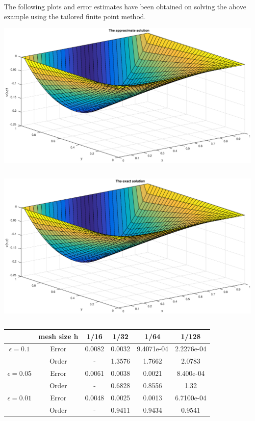 The following plots and error estimates have been obtained on solving the above example using the 
tailored finite point method.
\includegraphics[height=8cm]{Figures/CDR_approx_2.eps}\\
\includegraphics[height=8cm]{Figures/CDR_exact_1.eps}\\

\begin{tabular}{|c|c|c|c|c|c|}
   \hline
  & mesh size h  & 1/16  & 1/32 & 1/64 &  1/128\\
  \hline
 $\epsilon = 0.1$ & Error  & 0.0082  & 0.0032 & 9.4071e-04 &  2.2276e-04\\
 \hline
   &Order & -  &  1.3576  & 1.7662 & 2.0783\\
\hline
  $\epsilon = 0.05$ & Error  & 0.0061  & 0.0038 & 0.0021 &  8.400e-04\\
 \hline
   &Order & -  &  0.6828 & 0.8556 & 1.32\\
\hline
  $\epsilon = 0.01$ & Error  & 0.0048  & 0.0025 & 0.0013 &  6.7100e-04\\
 \hline
   &Order & -  &  0.9411  & 0.9434 & 0.9541\\
\hline
\end{tabular}

